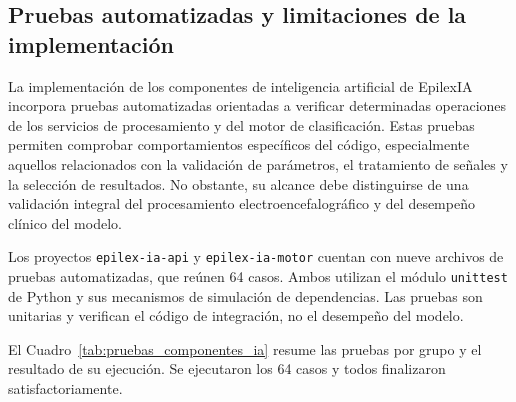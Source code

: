 \subsection[Pruebas automatizadas y limitaciones de la implementación]{Pruebas automatizadas y limitaciones de la \\implementación}

La implementación de los componentes de inteligencia artificial de
EpilexIA incorpora pruebas automatizadas orientadas a verificar
determinadas operaciones de los servicios de procesamiento y del motor
de clasificación. Estas pruebas permiten comprobar comportamientos
específicos del código, especialmente aquellos relacionados con la
validación de parámetros, el tratamiento de señales y la selección
de resultados. No obstante, su alcance debe distinguirse de una
validación integral del procesamiento electroencefalográfico y del
desempeño clínico del modelo.

Los proyectos \texttt{epilex-ia-api} y \texttt{epilex-ia-motor} cuentan con nueve archivos de pruebas automatizadas, que reúnen 64 casos.
Ambos utilizan el módulo \texttt{unittest} de Python y sus mecanismos de simulación de dependencias.
Las pruebas son unitarias y verifican el código de integración, no el desempeño del modelo.

El Cuadro~\ref{tab:pruebas_componentes_ia} resume las pruebas por grupo y el resultado de su ejecución.
Se ejecutaron los 64 casos y todos finalizaron satisfactoriamente.

